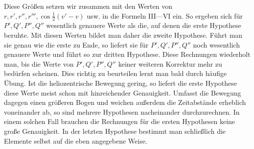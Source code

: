 Diese Größen setzen wir zusammen mit den Werten von $r,r',r'',r''',\cos\tfrac12(v'-v)$ usw. in die Formeln III—VI ein. So ergeben sich für $P',Q',P'',Q''$ wesentlich genauere Werte als die, auf denen die erste Hypothese beruhte. Mit diesen Werten bildet man daher die zweite Hypothese. Führt man sie genau wie die erste zu Ende, so liefert sie für $P',Q',P'',Q''$ noch wesentlich genauere Werte und führt so zur dritten Hypothese. Diese Rechnungen wiederholt man, bis die Werte von $P',Q',P'',Q''$ keiner weiteren Korrektur mehr zu bedürfen scheinen. Dies richtig zu beurteilen lernt man bald durch häufige Übung. Ist die heliozentrische Bewegung gering, so liefert die erste Hypothese diese Werte meist schon mit hinreichender Genauigkeit. Umfasst die Bewegung dagegen einen größeren Bogen und weichen außerdem die Zeitabstände erheblich voneinander ab, so sind mehrere Hypothesen nacheinander durchzurechnen. In einem solchen Fall brauchen die Rechnungen für die ersten Hypothesen keine große Genauigkeit. In der letzten Hypothese bestimmt man schließlich die Elemente selbst auf die eben angegebene Weise.
